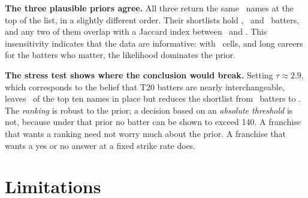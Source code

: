 \documentclass[11pt,a4paper]{article}
\begin{document}
\textbf{The three plausible priors agree.} All three return the same \ntopTenCommon\ names at
the top of the list, in a slightly different order. Their shortlists hold \nshortScout,
\nshortAnalyst\ and \nshortCfo\ batters, and any two of them overlap with a Jaccard index
between \njaccardLo\ and \njaccardHi. This insensitivity indicates that the data are
informative: with \nNcells\ cells, and long careers for the batters who matter, the likelihood
dominates the prior.

\textbf{The stress test shows where the conclusion would break.} Setting $\tau \approx 2.9$,
which corresponds to the belief that T20 batters are nearly interchangeable, leaves
\nstressKeeps\ of the top ten names in place but reduces the shortlist from \nshortAnalyst\
batters to \nshortStress. The
\emph{ranking} is robust to the prior; a decision based on an \emph{absolute threshold} is
not, because under that prior no batter can be shown to exceed 140. A franchise that wants a
ranking need not worry much about the prior. A franchise that wants a yes or no answer at a
fixed strike rate does.

\section{Limitations}\label{sec:limits}
\end{document}
